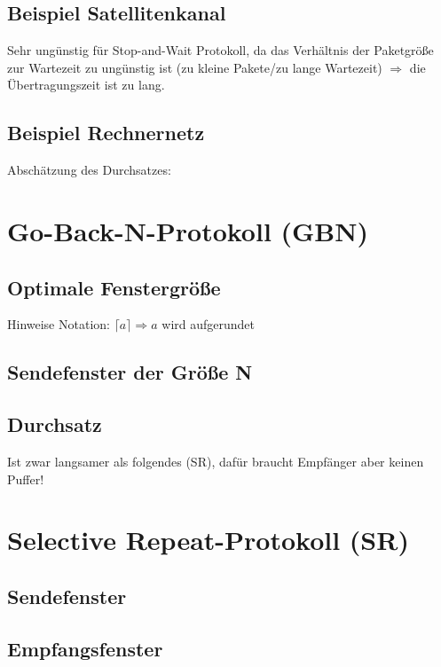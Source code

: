 \subsection{Beispiel Satellitenkanal}
Sehr ungünstig für Stop-and-Wait Protokoll, da das Verhältnis der Paketgröße zur Wartezeit zu ungünstig ist (zu kleine Pakete/zu lange Wartezeit) $\Rightarrow$ die Übertragungszeit ist zu lang.
\subsection{Beispiel Rechnernetz}
Abschätzung des Durchsatzes:

\section{Go-Back-N-Protokoll (GBN)}
\subsection{Optimale Fenstergröße}
Hinweise Notation: $\lceil a \rceil \Rightarrow a$ wird aufgerundet 
\subsection{Sendefenster der Größe N}
\subsection{Durchsatz}
Ist zwar langsamer als folgendes (SR), dafür braucht Empfänger aber keinen Puffer!

\section{Selective Repeat-Protokoll (SR)}
\subsection{Sendefenster}
\subsection{Empfangsfenster}
